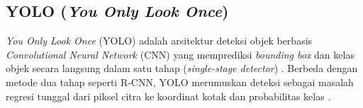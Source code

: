 
\subsection{YOLO (\textit{You Only Look Once})}
\textit{You Only Look Once} (YOLO) adalah arsitektur deteksi objek berbasis
\textit{Convolutional Neural Network} (CNN) yang memprediksi
\textit{bounding box} dan kelas objek secara langsung dalam satu tahap
(\textit{single-stage detector}) \cite{redmon2016you}. Berbeda dengan metode
dua tahap seperti R-CNN, YOLO merumuskan deteksi sebagai masalah regresi
tunggal dari piksel citra ke koordinat kotak dan probabilitas kelas
\cite{redmon2016you}.

